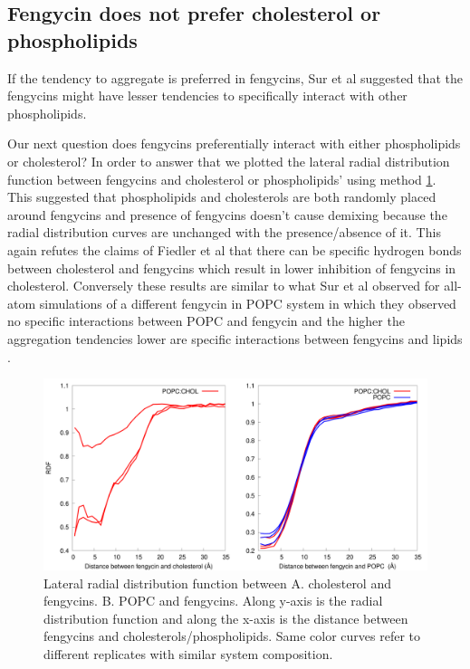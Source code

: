 \subsection{Fengycin does not prefer cholesterol or phospholipids}
\label{ss:no_fc_fp}
If the tendency to aggregate is preferred in fengycins, Sur et al suggested that the 
fengycins might have lesser tendencies to specifically interact with other phospholipids. 

Our next question does fengycins preferentially interact with either phospholipids or cholesterol? 
In order to answer that we plotted the lateral radial distribution function between fengycins and cholesterol or phospholipids' using method \ref{f:xyrdf_fc_fp}. This suggested that phospholipids and cholesterols are both randomly placed around fengycins and presence of fengycins doesn't cause demixing because the radial distribution curves are unchanged with the presence/absence of it. This again refutes the claims of Fiedler et al that there can be specific hydrogen bonds between cholesterol and fengycins which result in lower inhibition of fengycins in cholesterol.\cite{Heerklotz2015} 
Conversely these results are similar to what Sur et al observed for all-atom simulations of a different fengycin in POPC system in which they observed no specific interactions between POPC and fengycin and the higher the aggregation tendencies lower are specific interactions between fengycins and lipids \cite{Grossfield2018}.
\begin{figure}[h!]
\centering
\includegraphics[width=1.0\textwidth]{chapter3_figs/xyrdf_all_fc_fp.pdf}
\caption{Lateral radial distribution function between A. cholesterol and fengycins. B. POPC and fengycins. Along y-axis is the radial distribution function and along the x-axis is the distance between fengycins and cholesterols/phospholipids. Same color curves refer to different replicates with similar system composition.}
\label{f:xyrdf_fc_fp}
\end{figure}

